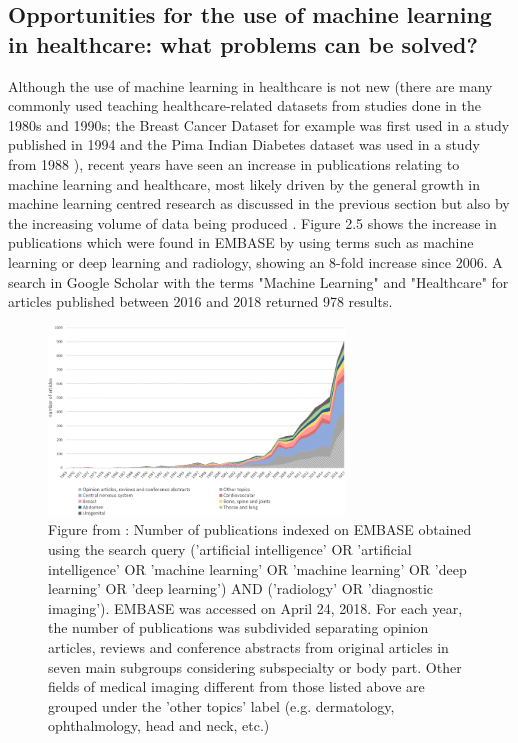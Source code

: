 \subsection{Opportunities for the use of machine learning in healthcare: what problems can be solved?}
Although the use of machine learning in healthcare is not new (there are many commonly used teaching healthcare-related datasets from studies done in the 1980s and 1990s; the Breast Cancer Dataset for example was first used in a study published in 1994 \citep{OLMangasarian:1994ue} and the Pima Indian Diabetes dataset was used in a study from 1988 \citep{Smith:1988wy}), recent years have seen an increase in publications relating to machine learning and healthcare, most likely driven by the general growth in machine learning centred research as discussed in the previous section but also by the increasing volume of data being produced \citep{Pesapane:2018kv}. Figure 2.5 shows the increase in publications which were found in EMBASE by using terms such as machine learning or deep learning and radiology, showing an 8-fold increase since 2006. A search in Google Scholar with the terms "Machine Learning" and "Healthcare" for articles published between 2016 and 2018 returned 978 results.\newline

\begin{figure}[H]
\centering
\includegraphics[width=0.7\textwidth]{ThesisTemplate/usingLatex/images/PesapaneFig.png}
\caption{Figure from \citep{Pesapane:2018kv}: Number of publications indexed on EMBASE obtained using the search query ('artificial intelligence' OR 'artificial intelligence' OR 'machine learning' OR 'machine learning' OR 'deep learning' OR 'deep learning') AND ('radiology' OR 'diagnostic imaging'). EMBASE was accessed on April 24, 2018. For each year, the number of publications was subdivided separating opinion articles, reviews and conference abstracts from original articles in seven main subgroups considering subspecialty or body part. Other fields of medical imaging different from those listed above are grouped under the 'other topics' label (e.g. dermatology, ophthalmology, head and neck, etc.)}
\label{fig:publications}
\end{figure}

